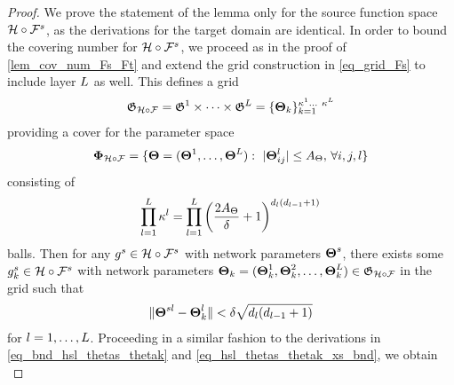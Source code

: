 \documentclass[review,supplement,onefignum,onetabnum]{siamonline250211}
\begin{document}
\begin{proof}
\label{pf_lem_cov_num_HFs_HFt}
We prove the statement of the lemma only for the source function space $\mathcal{H} \circ \mathcal{F}^s$, as the derivations for the target domain are identical. In order to bound the covering number for  $\mathcal{H} \circ \mathcal{F}^s$, we proceed as in the proof of \cref{lem_cov_num_Fs_Ft} and extend the grid construction in \eqref{eq_grid_Fs} to include layer $L$ as well. This defines a grid 
%
\begin{equation}
\label{eq_grid_HFs}
\begin{split}
\mathfrak{G}_{\mathcal{H} \circ \mathcal{F}} = \mathfrak{G}^1 \times \dots \times \mathfrak{G}^{L}  =  \{ \boldsymbol{\Theta}_k  \}_{k=1}^{\kappa^1 \dots \ \kappa^{L}}
\end{split}
\end{equation}
%
providing a cover for the parameter space
%
\begin{equation*}
\begin{split}
\mathbf{\Phi}_{\mathcal{H} \circ \mathcal{F}} &=\{ \boldsymbol{\Theta}=(\boldsymbol{\Theta} ^{1}, \dots, \boldsymbol{\Theta} ^{L}) :  \ |\boldsymbol{\Theta}^{l}_{ij}|  \leq {A_\Theta}, \,\forall i, j, l \} \\
\end{split}
\end{equation*}
%
consisting of 
%
\begin{equation}
\label{eq_num_balls_HsF}
\begin{split}
 \prod_{l=1}^{L}  \kappa^l = \prod_{l=1}^{L}  \left( \frac{2 {A_\Theta}}{\delta}+1  \right)^{ {d_l}({d_{l-1}}+1) }
\end{split}
\end{equation}
%
balls. Then for any   $g^s \in \mathcal{H} \circ \mathcal{F}^s$ with network parameters $\boldsymbol{\Theta}^{s}$, there exists some $g^s_k \in \mathcal{H} \circ \mathcal{F}^s$ with network parameters $\boldsymbol{\Theta}_k=(\boldsymbol{\Theta}_{k}^1, \boldsymbol{\Theta}_{k}^2, \dots, \boldsymbol{\Theta}_{k}^{L}) \in \mathfrak{G}_{\mathcal{H} \circ \mathcal{F}} $ in the grid such that
%
\begin{equation*}
\begin{split}
\| \boldsymbol{\Theta}^{sl} -  \boldsymbol{\Theta}_{k}^{l} \| < \delta  \sqrt{{d_l}({d_{l-1}}+1)}
\end{split}
\end{equation*}
%
for $l=1, \dots, L$. Proceeding in a similar fashion to the derivations in \eqref{eq_bnd_hsl_thetas_thetak} and \eqref{eq_hsl_thetas_thetak_xs_bnd}, we obtain
%
\begin{equation}

\end{equation}
\end{proof}
\end{document}
